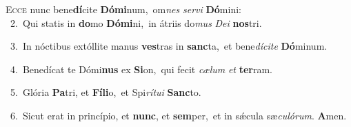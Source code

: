 \lettrine{\initial\textcolor{\initialcolor}{E}}{cce} nunc bene\-\textbf{dí}\-cite \textbf{Dó}\-\textbf{mi}num,~\star om\textit{nes} \textit{ser}\-\textit{vi} \textbf{Dó}\-mini:\\
{\numbfont\textcolor{\numbcolor}{~2.}}~Qui statis in \textbf{do}\-mo \textbf{Dó}\-\textbf{mi}ni,~\star in átriis do\textit{mus} \textit{De}\-\textit{i} \textbf{nos}\-tri.\par
{\numbfont\textcolor{\numbcolor}{~3.}}~In nóctibus extóllite manus \textbf{ves}\-tras in \textbf{sanc}\-ta,~\star et bene\-\textit{dí}\-\textit{ci}\textit{te} \textbf{Dó}\-minum.\par
{\numbfont\textcolor{\numbcolor}{~4.}}~Benedícat te Dómi\textbf{nus} ex \textbf{Si}\-on,~\star qui fecit \textit{cæ}\-\textit{lum} \textit{et} \textbf{ter}\-ram.\par
{\numbfont\textcolor{\numbcolor}{~5.}}~Glória \textbf{Pa}\-tri, et \textbf{Fí}\-\textbf{li}o,~\star et Spi\-\textit{rí}\-\textit{tu}\textit{i} \textbf{Sanc}\-to.\par
{\numbfont\textcolor{\numbcolor}{~6.}}~Sicut erat in princípio, et \textbf{nunc}\-, et \textbf{sem}\-per,~\star et in sǽcula sæ\-\textit{cu}\-\textit{ló}\textit{rum}. \textbf{A}\-men.\par
